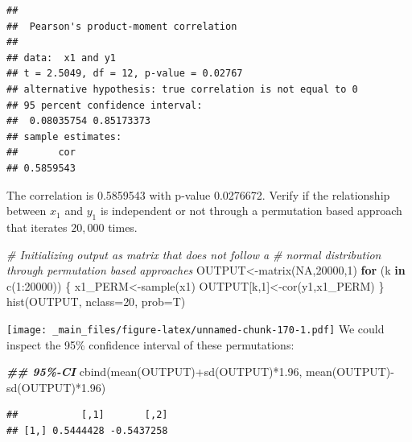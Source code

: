\documentclass[
  notitlepage,
  onecolumn,
  openany]{book}
\newenvironment{Shaded}{\begin{snugshade}}{\end{snugshade}}
\newcommand{\AttributeTok}[1]{\textcolor[rgb]{0.77,0.63,0.00}{#1}}
\newcommand{\CommentTok}[1]{\textcolor[rgb]{0.56,0.35,0.01}{\textit{#1}}}
\newcommand{\ConstantTok}[1]{\textcolor[rgb]{0.00,0.00,0.00}{#1}}
\newcommand{\ControlFlowTok}[1]{\textcolor[rgb]{0.13,0.29,0.53}{\textbf{#1}}}
\newcommand{\DecValTok}[1]{\textcolor[rgb]{0.00,0.00,0.81}{#1}}
\newcommand{\DocumentationTok}[1]{\textcolor[rgb]{0.56,0.35,0.01}{\textbf{\textit{#1}}}}
\newcommand{\FloatTok}[1]{\textcolor[rgb]{0.00,0.00,0.81}{#1}}
\newcommand{\FunctionTok}[1]{\textcolor[rgb]{0.00,0.00,0.00}{#1}}
\newcommand{\NormalTok}[1]{#1}
\newcommand{\OtherTok}[1]{\textcolor[rgb]{0.56,0.35,0.01}{#1}}
\newcommand{\SpecialCharTok}[1]{\textcolor[rgb]{0.00,0.00,0.00}{#1}}
\begin{document}
\begin{verbatim}
## 
##  Pearson's product-moment correlation
## 
## data:  x1 and y1
## t = 2.5049, df = 12, p-value = 0.02767
## alternative hypothesis: true correlation is not equal to 0
## 95 percent confidence interval:
##  0.08035754 0.85173373
## sample estimates:
##       cor 
## 0.5859543
\end{verbatim}

The correlation is 0.5859543 with p-value 0.0276672. Verify if the relationship between \(x_1\) and \(y_1\) is independent or not through a permutation based approach that iterates \(20,000\) times.

\begin{Shaded}
\begin{Highlighting}[]
\CommentTok{\# Initializing output as matrix that does not follow a }
\CommentTok{\# normal distribution through permutation based approaches}
\NormalTok{OUTPUT}\OtherTok{\textless{}{-}}\FunctionTok{matrix}\NormalTok{(}\ConstantTok{NA}\NormalTok{,}\DecValTok{20000}\NormalTok{,}\DecValTok{1}\NormalTok{)}
\ControlFlowTok{for}\NormalTok{ (k }\ControlFlowTok{in} \FunctionTok{c}\NormalTok{(}\DecValTok{1}\SpecialCharTok{:}\DecValTok{20000}\NormalTok{))}
\NormalTok{\{}
\NormalTok{  x1\_PERM}\OtherTok{\textless{}{-}}\FunctionTok{sample}\NormalTok{(x1)}
\NormalTok{  OUTPUT[k,}\DecValTok{1}\NormalTok{]}\OtherTok{\textless{}{-}}\FunctionTok{cor}\NormalTok{(y1,x1\_PERM)}
\NormalTok{\}}
\FunctionTok{hist}\NormalTok{(OUTPUT, }\AttributeTok{nclass=}\DecValTok{20}\NormalTok{, }\AttributeTok{prob=}\NormalTok{T)}
\end{Highlighting}
\end{Shaded}

\texttt{[image: \_main\_files/figure-latex/unnamed-chunk-170-1.pdf]}
We could inspect the 95\% confidence interval of these permutations:

\begin{Shaded}
\begin{Highlighting}[]
\DocumentationTok{\#\# 95\%{-}CI}
\FunctionTok{cbind}\NormalTok{(}\FunctionTok{mean}\NormalTok{(OUTPUT)}\SpecialCharTok{+}\FunctionTok{sd}\NormalTok{(OUTPUT)}\SpecialCharTok{*}\FloatTok{1.96}\NormalTok{, }\FunctionTok{mean}\NormalTok{(OUTPUT)}\SpecialCharTok{{-}}\FunctionTok{sd}\NormalTok{(OUTPUT)}\SpecialCharTok{*}\FloatTok{1.96}\NormalTok{)}
\end{Highlighting}
\end{Shaded}

\begin{verbatim}
##           [,1]       [,2]
## [1,] 0.5444428 -0.5437258
\end{verbatim}
\end{document}
